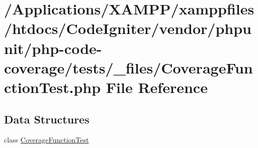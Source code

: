 \hypertarget{php-code-coverage_2tests_2__files_2_coverage_function_test_8php}{}\section{/\+Applications/\+X\+A\+M\+P\+P/xamppfiles/htdocs/\+Code\+Igniter/vendor/phpunit/php-\/code-\/coverage/tests/\+\_\+files/\+Coverage\+Function\+Test.php File Reference}
\label{php-code-coverage_2tests_2__files_2_coverage_function_test_8php}
\subsection*{Data Structures}
\begin{DoxyCompactItemize}
\item 
class \mbox{\hyperlink{class_coverage_function_test}{Coverage\+Function\+Test}}
\end{DoxyCompactItemize}

